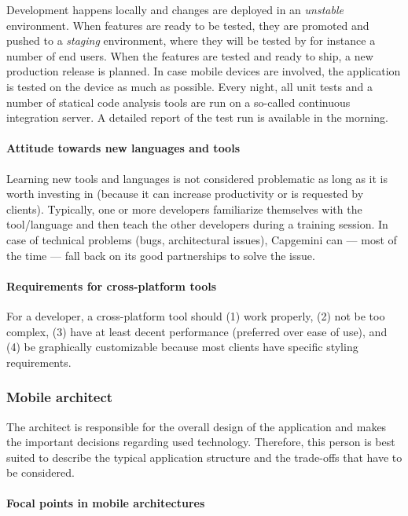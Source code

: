 Development happens locally and changes are deployed in an \emph{unstable}  environment. When features are ready to be tested, they are promoted and pushed to a \emph{staging} environment, where they will be tested by for instance a number of end users. When the features are tested and ready to ship, a new production release is planned. In case mobile devices are involved, the application is tested on the device as much as possible. Every night, all unit tests and a number of statical code analysis tools are run on a so-called continuous integration server. A detailed report of the test run is available in the morning.

\paragraph{Attitude towards new languages and tools} 

Learning new tools and languages is not considered problematic as long as it is worth investing in (because it can increase productivity or is requested by clients). Typically, one or more developers familiarize themselves with the tool/language and then teach the other developers during a training session. In case of technical problems (bugs, architectural issues), Capgemini can --- most of the time --- fall back on its good partnerships to solve the issue. 

\paragraph{Requirements for cross-platform tools}

For a developer, a cross-platform tool should (1) work properly, (2) not be too complex, (3) have at least decent performance (preferred over ease of use), and (4) be   graphically customizable because most clients have specific styling requirements.

\subsubsection{Mobile architect}

The architect is responsible for the overall design of the application and makes the important decisions regarding used technology. Therefore, this person is best suited to describe the typical application structure and the trade-offs that have to be considered.

\paragraph{Focal points in mobile architectures} 

